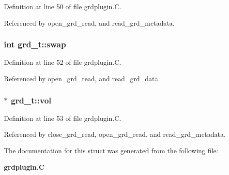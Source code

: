 Definition at line 50 of file grdplugin.C.

Referenced by open\_\-grd\_\-read, and read\_\-grd\_\-metadata.
\subsubsection{\setlength{\rightskip}{0pt plus 5cm}int grd\_\-t::swap}\label{structgrd__t_m3}




Definition at line 52 of file grdplugin.C.

Referenced by open\_\-grd\_\-read, and read\_\-grd\_\-data.
\subsubsection{$\ast$ grd\_\-t::vol}\label{structgrd__t_m4}




Definition at line 53 of file grdplugin.C.

Referenced by close\_\-grd\_\-read, open\_\-grd\_\-read, and read\_\-grd\_\-metadata.

The documentation for this struct was generated from the following file:\begin{CompactItemize}
\item 
{\bf grdplugin.C}\end{CompactItemize}
